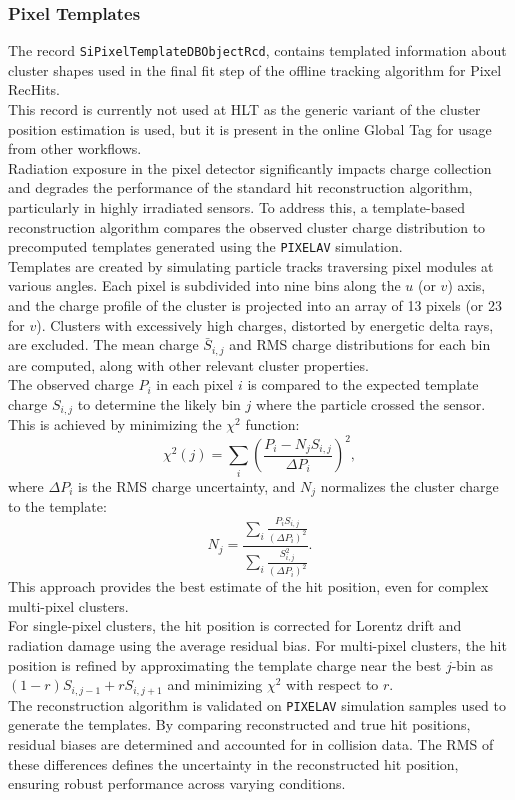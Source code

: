 \subsubsection{Pixel Templates}
The record \texttt{SiPixelTemplateDBObjectRcd}, contains templated information about cluster shapes used in the final fit step of the offline tracking algorithm for Pixel RecHits.\\
This record is currently not used at HLT as the generic variant of the cluster position estimation is used, but it is present in the online Global Tag for usage from other workflows.\\
Radiation exposure in the pixel detector significantly impacts charge collection and degrades the performance of the standard hit reconstruction algorithm, particularly in highly irradiated sensors. To address this, a template-based reconstruction algorithm compares the observed cluster charge distribution to precomputed templates generated using the \texttt{PIXELAV} simulation.\\
Templates are created by simulating particle tracks traversing pixel modules at various angles. Each pixel is subdivided into nine bins along the \(u\) (or \(v\)) axis, and the charge profile of the cluster is projected into an array of 13 pixels (or 23 for \(v\)). Clusters with excessively high charges, distorted by energetic delta rays, are excluded. The mean charge \(\bar{S}_{i,j}\) and RMS charge distributions for each bin are computed, along with other relevant cluster properties.\\
The observed charge \(P_i\) in each pixel \(i\) is compared to the expected template charge \(S_{i,j}\) to determine the likely bin \(j\) where the particle crossed the sensor. This is achieved by minimizing the \(\chi^2\) function:
\[
\chi^2(j) = \sum_i \left( \frac{P_i - N_j S_{i,j}}{\Delta P_i} \right)^2,
\]
where \(\Delta P_i\) is the RMS charge uncertainty, and \(N_j\) normalizes the cluster charge to the template:
\[
N_j = \frac{\sum_i \frac{P_i S_{i,j}}{(\Delta P_i)^2}}{\sum_i \frac{S_{i,j}^2}{(\Delta P_i)^2}}.
\]
This approach provides the best estimate of the hit position, even for complex multi-pixel clusters.\\

For single-pixel clusters, the hit position is corrected for Lorentz drift and radiation damage using the average residual bias. For multi-pixel clusters, the hit position is refined by approximating the template charge near the best \(j\)-bin as \((1-r)S_{i,j-1} + rS_{i,j+1}\) and minimizing \(\chi^2\) with respect to \(r\).\\
The reconstruction algorithm is validated on \texttt{PIXELAV} simulation \cite{Swartz:687440} samples used to generate the templates. By comparing reconstructed and true hit positions, residual biases are determined and accounted for in collision data. The RMS of these differences defines the uncertainty in the reconstructed hit position, ensuring robust performance across varying conditions.

